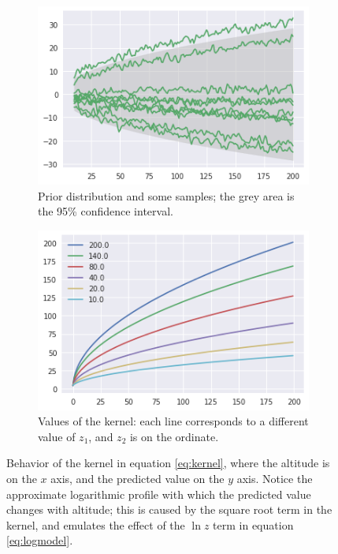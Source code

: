\documentclass[a4paper]{book}
\begin{document}
\begin{figure}
    \centering
    \begin{subfigure}[t]{0.45\textwidth}
        \centering
        \includegraphics[width=\textwidth]{images/profile_kernel_prior}
        \caption{Prior distribution and some samples; the grey area is the 95\% confidence interval.}
        \label{fig:kernel_prior}
    \end{subfigure}
    \hfill
    \begin{subfigure}[t]{0.45\textwidth}
        \centering
        \includegraphics[width=\textwidth]{images/kernel_values}
        \caption{Values of the kernel: each line corresponds to a different value of $z_1$, and $z_2$ is on the ordinate.}
        \label{fig:kernel_values}
    \end{subfigure}
    \caption{Behavior of the kernel in equation \ref{eq:kernel}, where the altitude is on the $x$ axis, and the predicted value on the $y$ axis. Notice the approximate logarithmic profile with which the predicted value changes with altitude; this is caused by the square root term in the kernel, and emulates the effect of the $\ln z$ term in equation \ref{eq:logmodel}.}
	\label{fig:kernel}
\end{figure}
\end{document}
